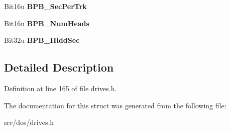 \begin{DoxyCompactItemize}
\item 
\hypertarget{structFAT__BPB__MSDOS30_a153ed79e2e708bde5a28fb52cb6998bc}{Bit16u {\bfseries B\-P\-B\-\_\-\-Sec\-Per\-Trk}}\label{structFAT__BPB__MSDOS30_a153ed79e2e708bde5a28fb52cb6998bc}

\item 
\hypertarget{structFAT__BPB__MSDOS30_a721117f42f45e05a41f272339577eba6}{Bit16u {\bfseries B\-P\-B\-\_\-\-Num\-Heads}}\label{structFAT__BPB__MSDOS30_a721117f42f45e05a41f272339577eba6}

\item 
\hypertarget{structFAT__BPB__MSDOS30_aecde36bb93eee1191ea55531e350f510}{Bit32u {\bfseries B\-P\-B\-\_\-\-Hidd\-Sec}}\label{structFAT__BPB__MSDOS30_aecde36bb93eee1191ea55531e350f510}

\end{DoxyCompactItemize}


\subsection{Detailed Description}


Definition at line 165 of file drives.\-h.



The documentation for this struct was generated from the following file\-:\begin{DoxyCompactItemize}
\item 
src/dos/drives.\-h\end{DoxyCompactItemize}
